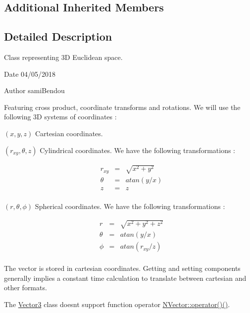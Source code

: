 \subsection*{Additional Inherited Members}


\subsection{Detailed Description}
Class representing 3D Euclidean space. 

\begin{DoxyDate}{Date}
04/05/2018 
\end{DoxyDate}
\begin{DoxyAuthor}{Author}
sami\+Bendou
\end{DoxyAuthor}
Featuring cross product, coordinate transforms and rotations. We will use the following 3D systems of coordinates \+:


\begin{DoxyItemize}
\item $ (x, y, z) $ Cartesian coordinates.
\item $ (r_{xy}, \theta, z) $ Cylindrical coordinates. We have the following transformations \+:
\end{DoxyItemize}

\[ \begin{align*} & r_{xy} & = & \sqrt{x^2 + y^2} \\ & \theta & = & atan(y / x) \\ & z & = & z \\ \end{align*} \]


\begin{DoxyItemize}
\item $ (r, \theta, \phi) $ Spherical coordinates. We have the following transformations \+:
\end{DoxyItemize}

\[ \begin{align*} & r & = & \sqrt{x^2 + y^2 + z^2} \\ & \theta & = & atan(y / x) \\ & \phi & = & atan(r_{xy} / z) \\ \end{align*} \]

The vector is stored in cartesian coordinates. Getting and setting components generally implies a constant time calculation to translate between cartesian and other formats.

The {\ttfamily \mbox{\hyperlink{class_vector3}{Vector3}}} class doesn\textquotesingle{}t support function operator {\ttfamily \mbox{\hyperlink{class_n_vector_a3ed21b63fd97af9c63bfacb372f733a5}{N\+Vector\+::operator()()}}}. 

